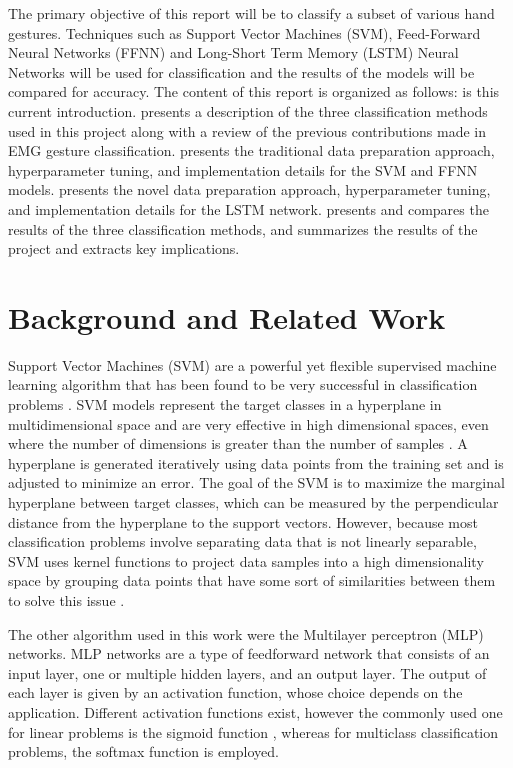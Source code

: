 \documentclass[journal]{IEEEtran}
\begin{document}
	The primary objective of this report will be to classify a subset of various hand gestures. Techniques such as Support Vector Machines (SVM), Feed-Forward Neural Networks (FFNN) and Long-Short Term Memory (LSTM) Neural Networks will be used for classification and the results of the models will be compared for accuracy. The content of this report is organized as follows:  is this current introduction.  presents a description of the three classification methods used in this project along with a review of the previous contributions made in EMG gesture classification.  presents the traditional data preparation approach, hyperparameter tuning, and implementation details for the SVM and FFNN models.  presents the novel data preparation approach, hyperparameter tuning, and implementation details for the LSTM network.  presents and compares the results of the three classification methods, and  summarizes the results of the project and extracts key implications.
	
	\label{sec:back}
	\label{sec:mat_met}
	
	\section{Background and Related Work}
	\label{sec:back}
	Support Vector Machines (SVM) are a powerful yet flexible supervised machine learning algorithm that has been found to be very successful in classification problems \cite{hearst1998}. SVM models represent the target classes in a hyperplane in multidimensional space and are very effective in high dimensional spaces, even where the number of dimensions is greater than the number of samples \cite{scikit-learn}. A hyperplane is generated iteratively using data points from the training set and is adjusted to minimize an error. The goal of the SVM is to maximize the marginal hyperplane between target classes, which can be measured by the perpendicular distance from the hyperplane to the support vectors. However, because most classification problems involve separating data that is not linearly separable, SVM uses kernel functions to project data samples into a high dimensionality space by grouping data points that have some sort of similarities between them to solve this issue \cite{hearst1998}. 
	
	The other algorithm used in this work were the Multilayer perceptron (MLP) networks. MLP networks are a type of feedforward network that consists of an input layer, one or multiple hidden layers, and an output layer. The output of each layer is given by an activation function, whose choice depends on the application. Different activation functions exist, however the commonly used one for linear problems is the sigmoid function \cite{bishop2006}, whereas for multiclass classification problems, the softmax function is employed.
	
\end{document}
